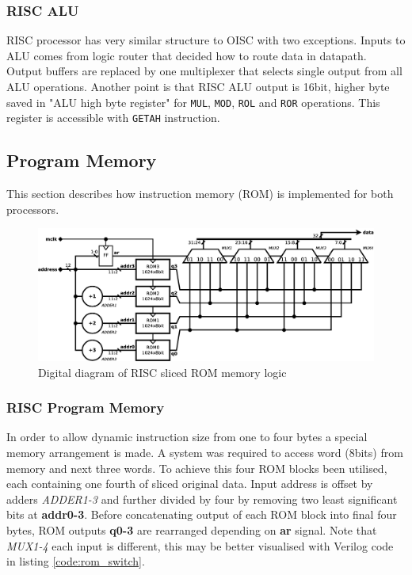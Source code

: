 \subsubsection{RISC ALU}
RISC processor has very similar structure to OISC with two exceptions. Inputs to ALU comes from logic router that decided how to route data in datapath. Output buffers are replaced by one multiplexer that selects single output from all ALU operations. Another point is that RISC ALU output is 16bit, higher byte saved in "ALU high byte register" for \texttt{MUL}, \texttt{MOD}, \texttt{ROL} and \texttt{ROR} operations. This register is accessible with \texttt{GETAH} instruction.

\subsection{Program Memory}\label{subsec:memory}
This section describes how instruction memory (ROM) is implemented for both processors.

\begin{figure}[b]
	\centering
	\includegraphics[scale=0.35]{../resources/risc_mem.eps}
	\caption{Digital diagram of RISC sliced ROM memory logic}
	\label{fig:risc_mem}
\end{figure}

\subsubsection{RISC Program Memory}
In order to allow dynamic instruction size from one to four bytes a special memory arrangement is made. A system was required to access word (8bits) from memory and next three words. To achieve this four ROM blocks been utilised, each containing one fourth of sliced original data. Input address is offset by adders \textit{ADDER1-3} and further divided by four by removing two least significant bits at \textbf{addr0-3}. 
Before concatenating output of each ROM block into final four bytes, ROM outputs \textbf{q0-3} are rearranged depending on \textbf{ar} signal. Note that \textit{MUX1-4} each input is different, this may be better visualised with Verilog code in listing \ref{code:rom_switch}.



